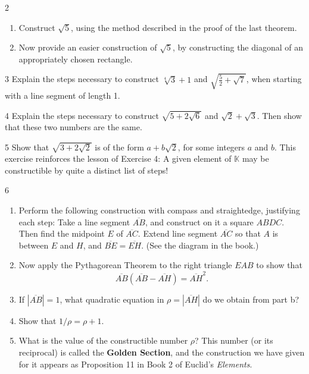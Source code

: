 \begin{problem}{2}
    \begin{enumerate}
        \item[(a)] Construct $\sqrt{5}$, using the method described in the proof of the
        last theorem.
        \item[(b)] Now provide an easier construction of $\sqrt{5}$, by constructing the
        diagonal of an appropriately chosen rectangle.
    \end{enumerate}
\end{problem}
\unsolved

\begin{problem}{3}
    Explain the steps necessary to construct $\sqrt[4]{3} + 1$ and
    $\sqrt{\frac{5}{2} + \sqrt{7}}$, when starting with a line segment of length 1.
\end{problem}
\unsolved

\begin{problem}{4}
    Explain the steps necessary to construct $\sqrt{5 + 2\sqrt{6}}$ and
    $\sqrt{2} + \sqrt{3}$. Then show that these two numbers are the same.
\end{problem}
\unsolved

\begin{problem}{5}
    Show that $\sqrt{3 + 2\sqrt{2}}$ is of the form $a + b\sqrt{2}$, for some integers $a$
    and $b$. This exercise reinforces the lesson of Exercise 4: A given element of
    $\mathbb{K}$ may be constructible by quite a distinct list of steps!
\end{problem}
\unsolved

\begin{problem}{6}
    \begin{enumerate}
        \item[(a)] Perform the following construction with compass and straightedge,
        justifying each step: Take a line segment $\overline{AB}$, and construct on it a
        square $ABDC$. Then find the midpoint $E$ of $\overline{AC}$. Extend line segment
        $\overline{AC}$ so that $A$ is between $E$ and $H$, and
        $\overline{BE} = \overline{EH}$. (See the diagram in the book.)
        \item[(b)] Now apply the Pythagorean Theorem to the right triangle $EAB$ to show
        that
        \[\overline{AB}(\overline{AB} - \overline{AH}) = \overline{AH}^2.\]
        \item[(c)] If $|\overline{AB}| = 1$, what quadratic equation in
        $\rho = |\overline{AH}|$ do we obtain from part b?
        \item[(d)] Show that $1/\rho = \rho + 1$.
        \item[(e)] What is the value of the constructible number $\rho$? This number (or its
        reciprocal) is called the \textbf{Golden Section}, and the construction we have
        given for it appears as Proposition 11 in Book 2 of Euclid's \emph{Elements}.
    \end{enumerate}
\end{problem}
\unsolved

